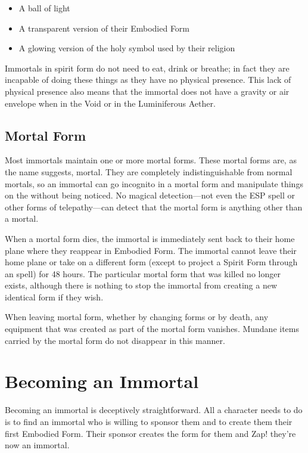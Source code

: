 \begin{multicols*}{2}
\begin{itemize}
	\item{A ball of light}
	\item{A transparent version of their Embodied Form}
	\item{A glowing version of the holy symbol used by their religion}
\end{itemize}
Immortals in spirit form do not need to eat, drink or breathe; in fact they are incapable of doing these things as they have no physical presence. This lack of physical presence also means that the immortal does not have a gravity or air envelope when in the Void or in the Luminiferous Aether.

\subsection{Mortal Form}
Most immortals maintain one or more mortal forms. These mortal forms are, as the name suggests, mortal. They are completely indistinguishable from normal mortals, so an immortal can go incognito in a mortal form and manipulate things on the  without being noticed. No magical detection—not even the ESP spell or other forms of telepathy—can detect that the mortal form is anything other than a mortal.

When a mortal form dies, the immortal is immediately sent back to their home plane where they reappear in Embodied Form. The immortal cannot leave their home plane or take on a different form (except to project a Spirit Form through an  spell) for 48 hours. The particular mortal form that was killed no longer exists, although there is nothing to stop the immortal from creating a new identical form if they wish.

When leaving mortal form, whether by changing forms or by death, any equipment that was created as part of the mortal form vanishes. Mundane items carried by the mortal form do not disappear in this manner.

\section{Becoming an Immortal}
Becoming an immortal is deceptively straightforward. All a character needs to do is to find an immortal who is willing to sponsor them and to create them their first Embodied Form. Their sponsor creates the form for them and Zap! they’re now an immortal.


\end{multicols*}
